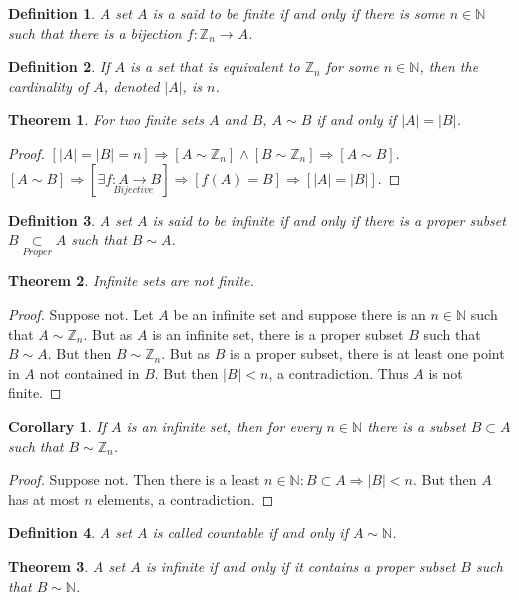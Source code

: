 \documentclass[crop=false,class=book]{standalone}
\theoremstyle{mystyle}
\newtheorem{theorem}{Theorem}[section]
\newtheorem{definition}{Definition}[section]
\newtheorem{corollary}{Corollary}[section]
\begin{document}
\begin{definition}
A set $A$ is a said to be finite if and only if there is some $n\in \mathbb{N}$ such that there is a bijection $f:\mathbb{Z}_n \rightarrow A$.
\end{definition}
\begin{definition}
If $A$ is a set that is equivalent to $\mathbb{Z}_n$ for some $n\in \mathbb{N}$, then the cardinality of $A$, denoted $|A|$, is $n$.
\end{definition}
\begin{theorem}
For two finite sets $A$ and $B$, $A\sim B$ if and only if $|A|=|B|$.
\end{theorem}
\begin{proof}
$[|A|=|B|=n]\Rightarrow[A\sim \mathbb{Z}_n]\land[B\sim \mathbb{Z}_n]\Rightarrow [A\sim B]$. $[A\sim B]\Rightarrow [\exists \underset{Bijective}{f:A\rightarrow B}]\Rightarrow [f(A) = B]\Rightarrow [|A|=|B|]$.
\end{proof}
\begin{definition}
A set $A$ is said to be infinite if and only if there is a proper subset $B\underset{Proper}\subset A$ such that $B\sim A$.
\end{definition}
\begin{theorem}
Infinite sets are not finite.
\end{theorem}
\begin{proof}
Suppose not. Let $A$ be an infinite set and suppose there is an $n\in \mathbb{N}$ such that $A\sim \mathbb{Z}_n$. But as $A$ is an infinite set, there is a proper subset $B$ such that $B\sim A$. But then $B\sim \mathbb{Z}_n$. But as $B$ is a proper subset, there is at least one point in $A$ not contained in $B$. But then $|B|<n$, a contradiction. Thus $A$ is not finite.
\end{proof}
\begin{corollary}
If $A$ is an infinite set, then for every $n\in \mathbb{N}$ there is a subset $B\subset A$ such that $B\sim \mathbb{Z}_n$.
\end{corollary}
\begin{proof}
Suppose not. Then there is a least $n\in \mathbb{N}:B\subset A\Rightarrow |B|<n$. But then $A$ has at most $n$ elements, a contradiction.
\end{proof}
\begin{definition}
A set $A$ is called countable if and only if $A\sim \mathbb{N}$.
\end{definition}
\begin{theorem}
A set $A$ is infinite if and only if it contains a proper subset $B$ such that $B\sim \mathbb{N}$.
\end{theorem}
\end{document}

